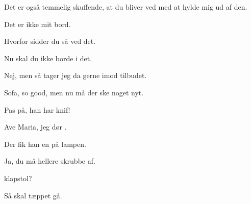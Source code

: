\documentclass[a4paper,11pt]{article}
\begin{document}
\begin{sketch}
     Det er også temmelig skuffende, at du bliver ved med at hylde mig ud af den.
    
     Det er ikke mit bord.
    
     Hvorfor sidder du så ved det.
    
     Nu skal du ikke borde i det.
    
     Nej, men så tager jeg da gerne imod tilbudet.
    
      Sofa, so good, men nu må der ske noget nyt.
    
    
     Pas på, han har knif!
    
    
     Ave Maria, jeg dør .
    
     Der fik han en på lampen.
    
     Ja, du må hellere skrubbe af.
    
    
     klapstol?
    
    
    
     Så skal tæppet gå.
    
\end{sketch}
\end{document}
